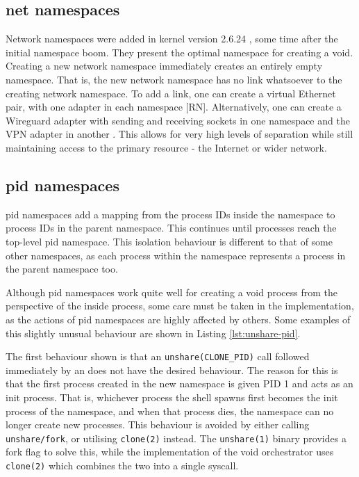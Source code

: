 \documentclass[sigplan]{acmart}
\begin{document}
\subsection{net namespaces}

Network namespaces were added in kernel version 2.6.24 \citep{noauthor_linux_2008}, some time after the initial namespace boom. They present the optimal namespace for creating a void. Creating a new network namespace immediately creates an entirely empty namespace. That is, the new network namespace has no link whatsoever to the creating network namespace. To add a link, one can create a virtual Ethernet pair, with one adapter in each namespace [RN]. Alternatively, one can create a Wireguard adapter with sending and receiving sockets in one namespace and the VPN adapter in another \citep[§7.3]{donenfeld_wireguard_2017}. This allows for very high levels of separation while still maintaining access to the primary resource - the Internet or wider network.

\subsection{pid namespaces}

pid namespaces add a mapping from the process IDs inside the namespace to process IDs in the parent namespace. This continues until processes reach the top-level pid namespace. This isolation behaviour is different to that of some other namespaces, as each process within the namespace represents a process in the parent namespace too.

Although pid namespaces work quite well for creating a void process from the perspective of the inside process, some care must be taken in the implementation, as the actions of pid namespaces are highly affected by others. Some examples of this slightly unusual behaviour are shown in Listing \ref{lst:unshare-pid}.

The first behaviour shown is that an \texttt{unshare(CLONE\_PID)} call followed immediately by an  does not have the desired behaviour. The reason for this is that the first process created in the new namespace is given PID 1 and acts as an init process. That is, whichever process the shell spawns first becomes the init process of the namespace, and when that process dies, the namespace can no longer create new processes. This behaviour is avoided by either calling \texttt{unshare/fork}, or utilising \texttt{clone(2)} instead. The \texttt{unshare(1)} binary provides a fork flag to solve this, while the implementation of the void orchestrator uses \texttt{clone(2)} which combines the two into a single syscall.
\end{document}
